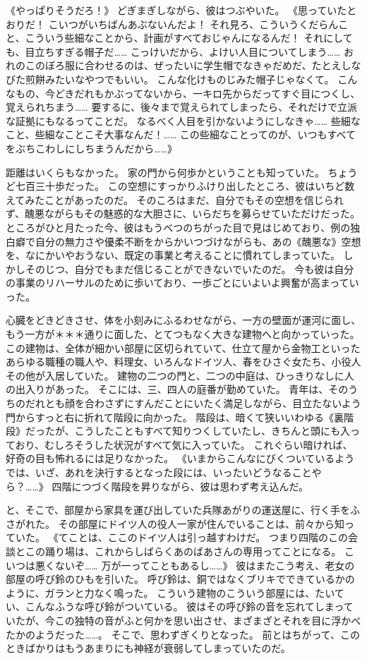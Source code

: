 《やっぱりそうだろ！》
どぎまぎしながら、彼はつぶやいた。
《思っていたとおりだ！
こいつがいちばんあぶないんだよ！
それ見ろ、こういうくだらんこと、こういう些細なことから、計画がすべておじゃんになるんだ！
それにしても、目立ちすぎる帽子だ……
こっけいだから、よけい人目についてしまう……
おれのこのぼろ服に合わせるのは、ぜったいに学生帽でなきゃだめだ、たとえしなびた煎餅みたいなやつでもいい。
こんな化けものじみた帽子じゃなくて。
こんなもの、今どきだれもかぶってないから、一キロ先からだってすぐ目につくし、覚えられちまう……
要するに、後々まで覚えられてしまったら、それだけで立派な証拠にもなるってことだ。
なるべく人目を引かないようにしなきゃ……
些細なこと、些細なことこそ大事なんだ！……
この些細なことってのが、いつもすべてをぶちこわしにしちまうんだから……》

距離はいくらもなかった。
家の門から何歩かということも知っていた。
ちょうど七百三十歩だった。
この空想にすっかりふけり出したところ、彼はいちど数えてみたことがあったのだ。
そのころはまだ、自分でもその空想を信じられず、醜悪ながらもその魅惑的な大胆さに、いらだちを募らせていただけだった。
ところがひと月たった今、彼はもうべつのちがった目で見はじめており、例の独白癖で自分の無力さや優柔不断をからかいつづけながらも、あの《醜悪な》空想を、なにかいやおうない、既定の事業と考えることに慣れてしまっていた。
しかしそのじつ、自分でもまだ信じることができないでいたのだ。
今も彼は自分の事業のリハーサルのために歩いており、一歩ごとにいよいよ興奮が高まっていった。

心臓をどきどきさせ、体を小刻みにふるわせながら、一方の壁面が運河に面し、もう一方が＊＊＊通りに面した、とてつもなく大きな建物へと向かっていった。
この建物は、全体が細かい部屋に区切られていて、仕立て屋から金物工といったあらゆる職種の職人や、料理女、いろんなドイツ人、春をひさぐ女たち、小役人その他が入居していた。
建物の二つの門と、二つの中庭は、ひっきりなしに人の出入りがあった。
そこには、三、四人の庭番が勤めていた。
青年は、そのうちのだれとも顔を合わさずにすんだことにいたく満足しながら、目立たないよう門からすっと右に折れて階段に向かった。
階段は、暗くて狭いいわゆる《裏階段》だったが、こうしたこともすべて知りつくしていたし、きちんと頭にも入っており、むしろそうした状況がすべて気に入っていた。
これぐらい暗ければ、好奇の目も怖れるには足りなかった。
《いまからこんなにびくついているようでは、いざ、あれを決行するとなった段には、いったいどうなることやら？……》
四階につづく階段を昇りながら、彼は思わず考え込んだ。

と、そこで、部屋から家具を運び出していた兵隊あがりの運送屋に、行く手をふさがれた。
その部屋にドイツ人の役人一家が住んでいることは、前々から知っていた。
《てことは、ここのドイツ人は引っ越すわけだ。
つまり四階のこの会談とこの踊り場は、これからしばらくあのばあさんの専用ってことになる。
こいつは悪くないぞ……
万が一ってこともあるし……》
彼はまたこう考え、老女の部屋の呼び鈴のひもを引いた。
呼び鈴は、銅ではなくブリキでできているかのように、ガランと力なく鳴った。
こういう建物のこういう部屋には、たいてい、こんなふうな呼び鈴がついている。
彼はその呼び鈴の音を忘れてしまっていたが、今この独特の音がふと何かを思い出させ、まざまざとそれを目に浮かべたかのようだった……。
そこで、思わずぎくりとなった。
前とはちがって、このときばかりはもうあまりにも神経が衰弱してしまっていたのだ。

